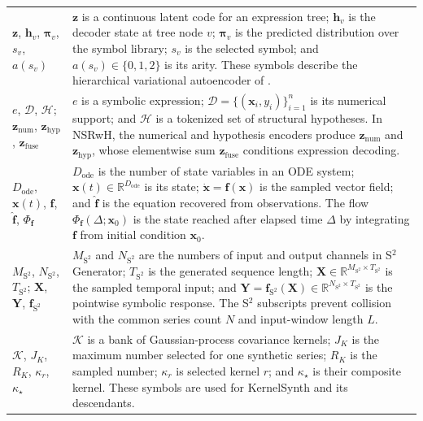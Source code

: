 \begin{longtable}{@{}
>{\raggedright\arraybackslash}p{}
>{\raggedright\arraybackslash}p{}@{}}
$\mathbf z$, $\mathbf h_v$, $\boldsymbol\pi_v$, $s_v$, $a(s_v)$ &
$\mathbf z$ is a continuous latent code for an expression tree;
$\mathbf h_v$ is the decoder state at tree node $v$;
$\boldsymbol\pi_v$ is the predicted distribution over the symbol library;
$s_v$ is the selected symbol; and $a(s_v)\in\{0,1,2\}$ is its arity. These
symbols describe the hierarchical variational autoencoder of
\citet{meznar2023efficient}. \\

$e$, $\mathcal D$, $\mathcal H$; $\mathbf z_{\mathrm{num}}$,
$\mathbf z_{\mathrm{hyp}}$, $\mathbf z_{\mathrm{fuse}}$ &
$e$ is a symbolic expression; $\mathcal D=\{(\mathbf x_i,y_i)\}_{i=1}^{n}$ is
its numerical support; and $\mathcal H$ is a tokenized set of structural
hypotheses. In NSRwH, the numerical and hypothesis encoders produce
$\mathbf z_{\mathrm{num}}$ and $\mathbf z_{\mathrm{hyp}}$, whose elementwise
sum $\mathbf z_{\mathrm{fuse}}$ conditions expression decoding. \\

$D_{\mathrm{ode}}$, $\mathbf x(t)$, $\mathbf f$, $\widehat{\mathbf f}$,
$\Phi_{\mathbf f}$ &
$D_{\mathrm{ode}}$ is the number of state variables in an ODE system;
$\mathbf x(t)\in\mathbb R^{D_{\mathrm{ode}}}$ is its state;
$\dot{\mathbf x}=\mathbf f(\mathbf x)$ is the sampled vector field; and
$\widehat{\mathbf f}$ is the equation recovered from observations. The flow
$\Phi_{\mathbf f}(\Delta;\mathbf x_0)$ is the state reached after elapsed time
$\Delta$ by integrating $\mathbf f$ from initial condition $\mathbf x_0$. \\

$M_{\mathrm{S^2}}$, $N_{\mathrm{S^2}}$, $T_{\mathrm{S^2}}$;
$\mathbf X$, $\mathbf Y$, $\mathbf f_{\mathrm{S^2}}$ &
$M_{\mathrm{S^2}}$ and $N_{\mathrm{S^2}}$ are the numbers of input and output
channels in S$^2$Generator; $T_{\mathrm{S^2}}$ is the generated sequence
length; $\mathbf X\in\mathbb R^{M_{\mathrm{S^2}}\times T_{\mathrm{S^2}}}$
is the sampled temporal input; and
$\mathbf Y=\mathbf f_{\mathrm{S^2}}(\mathbf X)\in
\mathbb R^{N_{\mathrm{S^2}}\times T_{\mathrm{S^2}}}$ is the pointwise
symbolic response. The S$^2$ subscripts prevent collision with the common
series count $N$ and input-window length $L$. \\

$\mathcal K$, $J_K$, $R_K$, $\kappa_r$, $\kappa_\star$ &
$\mathcal K$ is a bank of Gaussian-process covariance kernels; $J_K$ is the
maximum number selected for one synthetic series; $R_K$ is the sampled number;
$\kappa_r$ is selected kernel $r$; and $\kappa_\star$ is their composite
kernel. These symbols are used for KernelSynth and its descendants. \\


\end{longtable}

